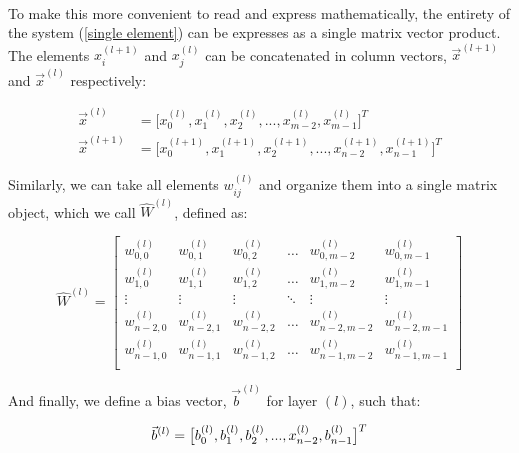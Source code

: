 \documentclass[12pt,letterpaper]{article}
\begin{document}
\paragraph*{}To make this more convenient to read and express mathematically, the entirety of the system (\ref{single element}) can be expresses as a single matrix vector product. The elements $x^{(l+1)}_i$ and $x^{(l)}_j$ can be concatenated in column vectors, $\vec{x}^{(l+1)}$ and $\vec{x}^{(l)}$ respectively:

\begin{equation}
\label{2 layers}
\begin{split}
\vec{x}^{(l)} 	&= \big[ x^{(l)}_0 , x^{(l)}_1 , x^{(l)}_2 , ... , x^{(l)}_{m-2} , x^{(l)}_{m-1} \big]^T \\
\vec{x}^{(l+1)} &= \big[ x^{(l+1)}_0 , x^{(l+1)}_1 , x^{(l+1)}_2 , ... , x^{(l+1)}_{n-2} , x^{(l+1)}_{n-1} \big]^T 
\end{split}
\end{equation}

Similarly, we can take all elements $w^{(l)}_{ij}$ and organize them into a single matrix object, which we call $\hat{W}^{(l)}$, defined as:

\begin{equation}
\label{weights}
\hat{W}^{(l)} = 
\begin{bmatrix}
w^{(l)}_{0,0} & w^{(l)}_{0,1} & w^{(l)}_{0,2} & \hdots & w^{(l)}_{0,m-2} & w^{(l)}_{0,m-1} \\
w^{(l)}_{1,0} & w^{(l)}_{1,1} & w^{(l)}_{1,2} & \hdots & w^{(l)}_{1,m-2} & w^{(l)}_{1,m-1} \\
\vdots & \vdots & \vdots & \ddots & \vdots & \vdots \\
w^{(l)}_{n-2,0} & w^{(l)}_{n-2,1} & w^{(l)}_{n-2,2} & \hdots & w^{(l)}_{n-2,m-2} & w^{(l)}_{n-2,m-1} \\
w^{(l)}_{n-1,0} & w^{(l)}_{n-1,1} & w^{(l)}_{n-1,2} & \hdots & w^{(l)}_{n-1,m-2} & w^{(l)}_{n-1,m-1} \\
\end{bmatrix}
\end{equation}

And finally, we define a bias vector, $\vec{b}^{(l)}$ for layer $(l)$, such that:

\begin{equation}
\label{bias}
\vec{b}^{(l)} = \big[ b^{(l)}_0 , b^{(l)}_1 , b^{(l)}_2 , ... , x^{(l)}_{n-2} , b^{(l)}_{n-1} \big]^T \\
\end{equation}
\end{document}
